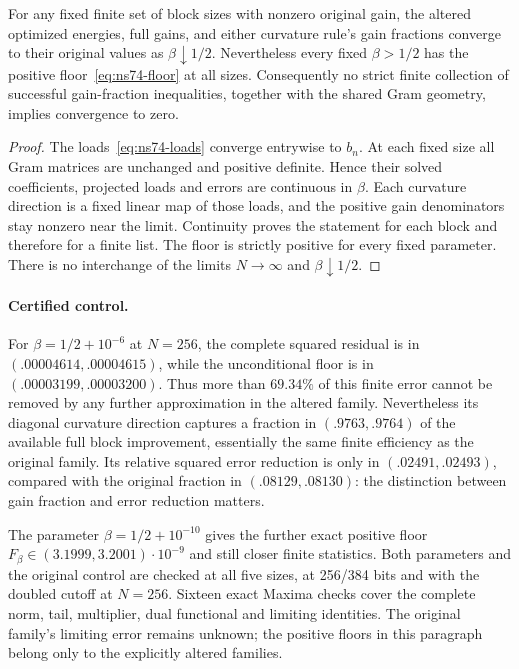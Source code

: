 \begin{corollary}
\label{cor:ns74-finite-indistinguishability}
For any fixed finite set of block sizes with nonzero original gain,
the altered optimized energies, full gains, and either curvature
rule's gain fractions converge to their original values as
$\beta\downarrow1/2$. Nevertheless every fixed $\beta>1/2$ has the
positive floor~\eqref{eq:ns74-floor} at all sizes. Consequently no
strict finite collection of successful gain-fraction inequalities,
together with the shared Gram geometry, implies convergence to zero.
\end{corollary}
\begin{proof}
The loads~\eqref{eq:ns74-loads} converge entrywise to $b_n$.
At each fixed size all Gram matrices are unchanged and positive
definite. Hence their solved coefficients, projected loads and errors
are continuous in $\beta$. Each curvature direction is a fixed linear
map of those loads, and the positive gain denominators stay nonzero
near the limit. Continuity proves the statement for each block and
therefore for a finite list. The floor is strictly positive for every
fixed parameter. There is no interchange of the limits $N\to\infty$
and $\beta\downarrow1/2$.
\end{proof}

\paragraph{Certified control.}
For $\beta=1/2+10^{-6}$ at $N=256$, the complete squared residual is
in $(.00004614,.00004615)$, while the unconditional floor is in
$(.00003199,.00003200)$. Thus more than $69.34\%$ of this finite error
cannot be removed by any further approximation in the altered family.
Nevertheless its diagonal curvature direction captures a fraction in
$(.9763,.9764)$ of the available full block improvement, essentially
the same finite efficiency as the original family. Its relative squared
error reduction is only in $(.02491,.02493)$, compared with the original
fraction in $(.08129,.08130)$: the distinction between gain fraction and
error reduction matters.

The parameter $\beta=1/2+10^{-10}$ gives the further exact positive floor
$F_\beta\in(3.1999,3.2001)\cdot10^{-9}$ and still closer finite statistics.
Both parameters and the original control are checked at all five sizes,
at 256/384 bits and with the doubled cutoff at $N=256$. Sixteen exact
Maxima checks cover the complete norm, tail, multiplier, dual functional
and limiting identities. The original family's limiting error remains
unknown; the positive floors in this paragraph belong only to the
explicitly altered families.
